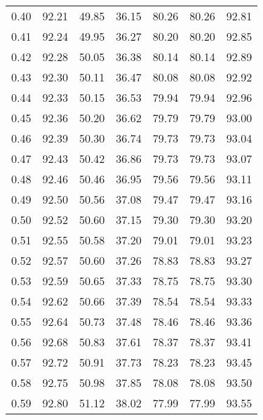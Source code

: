 \begin{tabular}{|c|c|c|c|c|c|c|}
      0.40 &     92.21 &     49.85 &      36.15 &   80.26 &      80.26 &         92.81 \\
      0.41 &     92.24 &     49.95 &      36.27 &   80.20 &      80.20 &         92.85 \\
      0.42 &     92.28 &     50.05 &      36.38 &   80.14 &      80.14 &         92.89 \\
      0.43 &     92.30 &     50.11 &      36.47 &   80.08 &      80.08 &         92.92 \\
      0.44 &     92.33 &     50.15 &      36.53 &   79.94 &      79.94 &         92.96 \\
      0.45 &     92.36 &     50.20 &      36.62 &   79.79 &      79.79 &         93.00 \\
      0.46 &     92.39 &     50.30 &      36.74 &   79.73 &      79.73 &         93.04 \\
      0.47 &     92.43 &     50.42 &      36.86 &   79.73 &      79.73 &         93.07 \\
      0.48 &     92.46 &     50.46 &      36.95 &   79.56 &      79.56 &         93.11 \\
      0.49 &     92.50 &     50.56 &      37.08 &   79.47 &      79.47 &         93.16 \\
      0.50 &     92.52 &     50.60 &      37.15 &   79.30 &      79.30 &         93.20 \\
      0.51 &     92.55 &     50.58 &      37.20 &   79.01 &      79.01 &         93.23 \\
      0.52 &     92.57 &     50.60 &      37.26 &   78.83 &      78.83 &         93.27 \\
      0.53 &     92.59 &     50.65 &      37.33 &   78.75 &      78.75 &         93.30 \\
      0.54 &     92.62 &     50.66 &      37.39 &   78.54 &      78.54 &         93.33 \\
      0.55 &     92.64 &     50.73 &      37.48 &   78.46 &      78.46 &         93.36 \\
      0.56 &     92.68 &     50.83 &      37.61 &   78.37 &      78.37 &         93.41 \\
      0.57 &     92.72 &     50.91 &      37.73 &   78.23 &      78.23 &         93.45 \\
      0.58 &     92.75 &     50.98 &      37.85 &   78.08 &      78.08 &         93.50 \\
      0.59 &     92.80 &     51.12 &      38.02 &   77.99 &      77.99 &         93.55 \\

\end{tabular}
